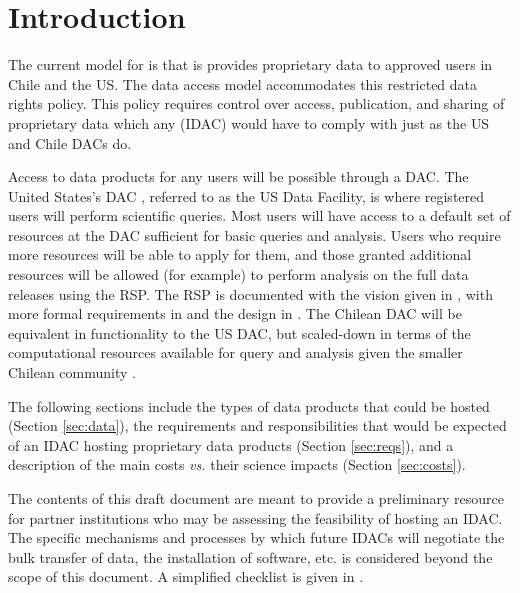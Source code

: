 \section{Introduction}\label{sec:intro}


The current model for \VRO is that is provides proprietary data to approved users in Chile and the \gls{US}. The data access model accommodates this restricted data rights policy. This policy requires control over access, publication, and sharing of proprietary data which any (\gls{IDAC}) would have to comply with just as the \gls{US} and Chile DACs do.

Access to \RO data products for any users will be possible through a \gls{DAC}. The United States's \gls{DAC} , referred to as the \gls{US} Data Facility, is
where registered \RO users will perform scientific queries. Most users will have access to a default set of resources at the \gls{DAC} sufficient for basic queries and analysis. Users who require more resources will be able to apply for them, and those granted additional resources will be allowed (for example) to perform analysis on the full data releases using the \gls{RSP}. The \gls{RSP} is documented with the vision given in , with more formal requirements in  and the design in . The Chilean \gls{DAC} will be equivalent in functionality to the \gls{US} \gls{DAC}, but scaled-down in terms of the computational resources available for query and analysis given the smaller Chilean community .

The following sections include the types of data products that could be hosted (Section \ref{sec:data}), the requirements and responsibilities that would be expected of an \gls{IDAC} hosting \RO proprietary data products (Section \ref{sec:reqs}), and a description of the main costs {\it vs.} their science impacts (Section \ref{sec:costs}).

The contents of this draft document are meant to provide a preliminary resource for partner institutions who may be assessing the feasibility of hosting an \gls{IDAC}. The specific mechanisms and processes by which future \gls{IDAC}s will negotiate the bulk transfer of data, the installation of software, etc. is considered beyond the scope of this document. A simplified checklist is given in .

